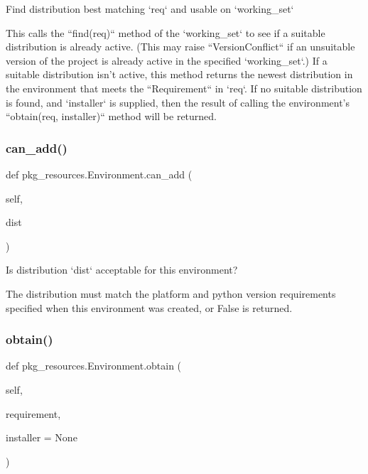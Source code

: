 \begin{DoxyVerb}Find distribution best matching `req` and usable on `working_set`

This calls the ``find(req)`` method of the `working_set` to see if a
suitable distribution is already active.  (This may raise
``VersionConflict`` if an unsuitable version of the project is already
active in the specified `working_set`.)  If a suitable distribution
isn't active, this method returns the newest distribution in the
environment that meets the ``Requirement`` in `req`.  If no suitable
distribution is found, and `installer` is supplied, then the result of
calling the environment's ``obtain(req, installer)`` method will be
returned.
\end{DoxyVerb}
 \mbox{\label{classpkg__resources_1_1Environment_ac68862356ee785bb410b3d2a503952f1}} 
\subsubsection{\texorpdfstring{can\+\_\+add()}{can\_add()}}
{\footnotesize\ttfamily def pkg\+\_\+resources.\+Environment.\+can\+\_\+add (\begin{DoxyParamCaption}\item[{}]{self,  }\item[{}]{dist }\end{DoxyParamCaption})}

\begin{DoxyVerb}Is distribution `dist` acceptable for this environment?

The distribution must match the platform and python version
requirements specified when this environment was created, or False
is returned.
\end{DoxyVerb}
 \mbox{\label{classpkg__resources_1_1Environment_af631296df13a518bb3cd97f04efa25fd}} 
\subsubsection{\texorpdfstring{obtain()}{obtain()}}
{\footnotesize\ttfamily def pkg\+\_\+resources.\+Environment.\+obtain (\begin{DoxyParamCaption}\item[{}]{self,  }\item[{}]{requirement,  }\item[{}]{installer = {\ttfamily None} }\end{DoxyParamCaption})}

